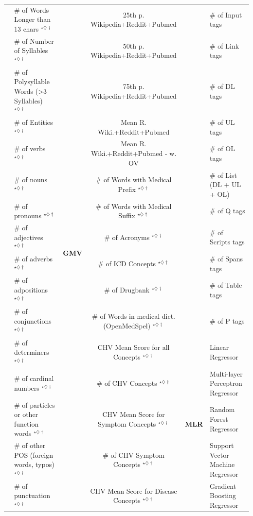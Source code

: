 \documentclass[10pt,a4paper]{article}
\begin{document}
\begin{table}[tb]
{\begin{tabular}{llccll}
			& \# of Words Longer than 13 chars $^{\star\diamondsuit\dagger}$  &  & 25th p. Wikipedia+Reddit+Pubmed  &  & \# of Input tags\tabularnewline
			& \# of Number of Syllables $^{\star\diamondsuit\dagger}$  &  & 50th p. Wikipedia+Reddit+Pubmed  &  & \# of Link tags\tabularnewline
			& \# of Polysyllable Words (\textgreater{}3 Syllables) $^{\star\diamondsuit\dagger}$  &  & 75th p. Wikipedia+Reddit+Pubmed  &  & \# of DL tags\tabularnewline
			\cline{1-2}
			\multirow{20}{*}{\textbf{\makecell{NL}}}  & \# of Entities $^{\star\diamondsuit\dagger}$  &  & Mean R. Wiki.+Reddit+Pubmed  &  & \# of UL tags\tabularnewline
			& \# of verbs $^{\star\diamondsuit\dagger}$  &  & Mean R. Wiki.+Reddit+Pubmed - w. OV  &  & \# of OL tags\tabularnewline
			\cline{3-4} 
			& \# of nouns $^{\star\diamondsuit\dagger}$  & \multirow{6}{*}{\textbf{GMV}}  & \# of Words with Medical Prefix $^{\star\diamondsuit\dagger}$  &  & \# of List (DL + UL + OL)\tabularnewline
			& \# of pronouns $^{\star\diamondsuit\dagger}$  &  & \# of Words with Medical Suffix $^{\star\diamondsuit\dagger}$  &  & \# of Q tags\tabularnewline
			& \# of adjectives $^{\star\diamondsuit\dagger}$  &  & \# of Acronyms $^{\star\diamondsuit\dagger}$  &  & \# of Scripts tags\tabularnewline
			& \# of adverbs $^{\star\diamondsuit\dagger}$  &  & \# of ICD Concepts $^{\star\diamondsuit\dagger}$  &  & \# of Spans tags\tabularnewline
			& \# of adpositions $^{\star\diamondsuit\dagger}$  &  & \# of Drugbank $^{\star\diamondsuit\dagger}$  &  & \# of Table tags\tabularnewline
			& \# of conjunctions $^{\star\diamondsuit\dagger}$  &  & \# of Words in medical dict. (OpenMedSpel) $^{\star\diamondsuit\dagger}$  &  & \# of P tags\tabularnewline
			\cline{3-6}
			& \# of determiners $^{\star\diamondsuit\dagger}$  & \multirow{6}{*}{\textbf{\makecell{CMV}}}  & CHV Mean Score for all Concepts $^{\star\diamondsuit\dagger}$  & \multirow{6}{*}{\textbf{MLR}}  & Linear Regressor\tabularnewline
			& \# of cardinal numbers $^{\star\diamondsuit\dagger}$  &  & \# of CHV Concepts $^{\star\diamondsuit\dagger}$  &  & Multi-layer Perceptron Regressor\tabularnewline
			& \# of particles or other function words $^{\star\diamondsuit\dagger}$  &  & CHV Mean Score for Symptom Concepts $^{\star\diamondsuit\dagger}$  &  & Random Forest Regressor\tabularnewline
			& \# of other POS (foreign words, typos) $^{\star\diamondsuit\dagger}$  &  & \# of CHV Symptom Concepts $^{\star\diamondsuit\dagger}$  &  & Support Vector Machine Regressor\tabularnewline
			& \# of punctuation $^{\star\diamondsuit\dagger}$  &  & CHV Mean Score for Disease Concepts $^{\star\diamondsuit\dagger}$  &  & Gradient Boosting Regressor\tabularnewline

\end{tabular}}
\end{table}
\end{document}
